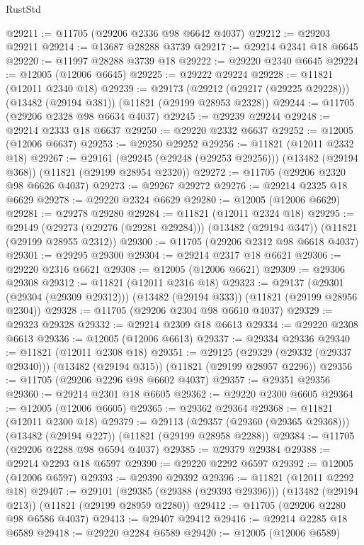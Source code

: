 \begin{lexlean}{RustStd}
\begin{coremodule}
@29211 := @11705 (@29206 @2336 @98 @6642 @4037)
@29212 := @29203 @29211
@29214 := @13687 @28288 @3739
@29217 := @29214 @2341 @18 @6645
@29220 := @11997 @28288 @3739 @18
@29222 := @29220 @2340 @6645
@29224 := @12005 (@12006 @6645)
@29225 := @29222 @29224
@29228 := @11821 (@12011 @2340 @18)
@29239 := @29173
    (@29212 (@29217 (@29225 @29228)))
    (@13482 (@29194 @381))
    (@11821 (@29199 @28953 @2328))
@29244 := @11705 (@29206 @2328 @98 @6634 @4037)
@29245 := @29239 @29244
@29248 := @29214 @2333 @18 @6637
@29250 := @29220 @2332 @6637
@29252 := @12005 (@12006 @6637)
@29253 := @29250 @29252
@29256 := @11821 (@12011 @2332 @18)
@29267 := @29161
    (@29245 (@29248 (@29253 @29256)))
    (@13482 (@29194 @368))
    (@11821 (@29199 @28954 @2320))
@29272 := @11705 (@29206 @2320 @98 @6626 @4037)
@29273 := @29267 @29272
@29276 := @29214 @2325 @18 @6629
@29278 := @29220 @2324 @6629
@29280 := @12005 (@12006 @6629)
@29281 := @29278 @29280
@29284 := @11821 (@12011 @2324 @18)
@29295 := @29149
    (@29273 (@29276 (@29281 @29284)))
    (@13482 (@29194 @347))
    (@11821 (@29199 @28955 @2312))
@29300 := @11705 (@29206 @2312 @98 @6618 @4037)
@29301 := @29295 @29300
@29304 := @29214 @2317 @18 @6621
@29306 := @29220 @2316 @6621
@29308 := @12005 (@12006 @6621)
@29309 := @29306 @29308
@29312 := @11821 (@12011 @2316 @18)
@29323 := @29137
    (@29301 (@29304 (@29309 @29312)))
    (@13482 (@29194 @333))
    (@11821 (@29199 @28956 @2304))
@29328 := @11705 (@29206 @2304 @98 @6610 @4037)
@29329 := @29323 @29328
@29332 := @29214 @2309 @18 @6613
@29334 := @29220 @2308 @6613
@29336 := @12005 (@12006 @6613)
@29337 := @29334 @29336
@29340 := @11821 (@12011 @2308 @18)
@29351 := @29125
    (@29329 (@29332 (@29337 @29340)))
    (@13482 (@29194 @315))
    (@11821 (@29199 @28957 @2296))
@29356 := @11705 (@29206 @2296 @98 @6602 @4037)
@29357 := @29351 @29356
@29360 := @29214 @2301 @18 @6605
@29362 := @29220 @2300 @6605
@29364 := @12005 (@12006 @6605)
@29365 := @29362 @29364
@29368 := @11821 (@12011 @2300 @18)
@29379 := @29113
    (@29357 (@29360 (@29365 @29368)))
    (@13482 (@29194 @227))
    (@11821 (@29199 @28958 @2288))
@29384 := @11705 (@29206 @2288 @98 @6594 @4037)
@29385 := @29379 @29384
@29388 := @29214 @2293 @18 @6597
@29390 := @29220 @2292 @6597
@29392 := @12005 (@12006 @6597)
@29393 := @29390 @29392
@29396 := @11821 (@12011 @2292 @18)
@29407 := @29101
    (@29385 (@29388 (@29393 @29396)))
    (@13482 (@29194 @213))
    (@11821 (@29199 @28959 @2280))
@29412 := @11705 (@29206 @2280 @98 @6586 @4037)
@29413 := @29407 @29412
@29416 := @29214 @2285 @18 @6589
@29418 := @29220 @2284 @6589
@29420 := @12005 (@12006 @6589)

\end{coremodule}
\end{lexlean}
